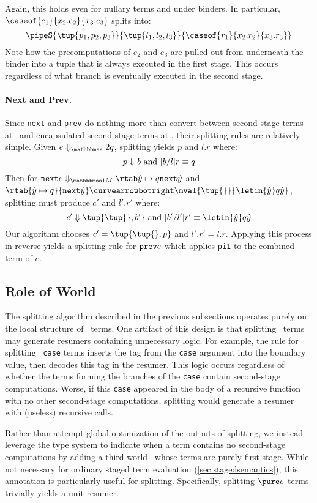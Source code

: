 \begin{abstrsyn}
Again, this holds even for nullary terms and under binders.
In particular, $\caseof{e_1}{x_2.e_2}{x_3.e_3}$ splits into:
\[
\pipeS {\tup{p_1,p_2,p_3}} {\tup{l_1,l_2,l_3}} {\caseof{r_1}{x_2.r_2}{x_3.r_3}}
\]
Note how the precomputations of $e_2$ and $e_3$ are pulled out from
underneath the binder into a tuple that is always executed in the
first stage. This occurs regardless of what branch is eventually
executed in the second stage.

\paragraph{Next and Prev.}
Since \texttt{next} and \texttt{prev} do nothing more than convert between 
second-stage terms at \bbtwo\ and encapsulated second-stage terms at \bbonem,
their splitting rules are relatively simple.
Given $\diatwo e q$, splitting yields $p$ and $l.r$ where:
\[
	{p} \Downarrow {b} \text{ and } [b/l]r \equiv q
\]
Then for $\diaone {\next {e}} {{\hat y} \mapsto q} {\next {\hat y}}$
and\\ $\rtab {{\hat y} \mapsto q} {\next {\hat y}} \vsplito \mval {\tup{}} {\letin {\hat y} q {\hat y}}$, splitting must produce $c'$ and $l'.r'$ where:
\[
	\reduce {c'} {\tup {\tup{},b'}} \text{ and } [b'/l']r' \equiv \letin {\hat y} q {\hat y}
\]
Our algorithm chooses $c' = \tup{\tup{},p}$ and $l'.r' = l.r$.
Applying this process in reverse yields a splitting rule for ${\tt prev} e$ which applies \texttt{pi1} to the combined term of $e$.

\subsection {Role of World \bbonep}
\label{sec:needGround}

The splitting algorithm described in the previous subsections operates
purely on the local structure of \lang\ terms.  One artifact of this design
is that splitting \bbonem\ terms may generate resumers containing
unnecessary logic.  For example, the rule for splitting
\bbonem\ \texttt{case} terms inserts the tag from the \texttt{case}
argument into the boundary value, then decodes this tag in the
resumer. This logic occurs regardless of whether the terms forming the
branches of the \texttt{case} contain second-stage computations.
Worse, if this \texttt{case} appeared in the body of a recursive
function with no other second-stage computations, splitting would
generate a resumer with (useless) recursive calls.

Rather than attempt global optimization of the outputs of splitting,
we instead leverage the type system to indicate when a term contains
no second-stage computations by adding a third world \bbonep\ whose
terms are purely first-stage.  While not necessary for ordinary staged
term evaluation (\ref{sec:stagedsemantics}), this annotation is
particularly useful for splitting. Specifically, splitting $\pure e$
terms trivially yields a unit resumer.


\end{abstrsyn}
